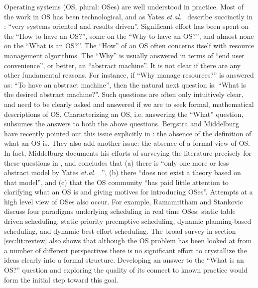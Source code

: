\documentclass[draft]{article}
\def\etal{{\it et.al.}\ }
\begin{document}
Operating systems (OS, plural:  OSes) are well understood in practice.
Most of  the work  in OS  has been technological,  and as  Yates \etal
describe  succinctly  in  \cite{Yates99i/oautomaton}:  ``very  systems
oriented and  results driven''.  Significant effort has  been spent on
the ``How to  have an OS?'', some  on the ``Why to have  an OS?'', and
almost none  on the ``What  is an OS?''.   The ``How'' of an  OS often
concerns itself  with resource management algorithms.   The ``Why'' is
usually answered in  terms of ``end user convenience'',  or better, an
``abstract  machine''.   It  is  not  clear if  there  are  any  other
fundamental reasons.   For instance, if ``Why  manage resources?''  is
answered as:  ``To have an  abstract machine'', then the  natural next
question  is:  ``What  is   the  desired  abstract  machine?''.   Such
questions are  often only  intuitively clear, and  need to  be clearly
asked and answered if we are to seek formal, mathematical descriptions
of OS.   Characterizing an OS, i.e.  answering  the ``What'' question,
subsumes  the  answers to  both  the  above  questions.  Bergstra  and
Middelburg  have  recently  pointed   out  this  issue  explicitly  in
\cite{DBLP:journals/corr/abs-1006-0813}: the absence of the definition
of  what an OS  is.  They  also add  another issue:  the absence  of a
formal  view of  OS.  In  fact,  Middelburg documents  his efforts  of
surveying   the   literature   precisely   for  these   questions   in
\cite{DBLP:journals/corr/abs-1003-5525}, and  concludes that (a) there
is  ``only   one  more   or  less  abstract   model  by   Yates  \etal
\cite{Yates99i/oautomaton}'',  (b)  there ``does  not  exist a  theory
based on that model'', and (c) that the OS community ``has paid little
attention  to  clarifying  what  an  OS  is  and  giving  motives  for
introducing OSes''.  Attempts at a high level view of OSes also occur.
For         example,         Ramamritham         and         Stankovic
\cite{Ramamritham94schedulingalgorithms}    discuss   four   paradigms
underlying  scheduling   in  real  time  OSes:   static  table  driven
scheduling,    static   priority   preemptive    scheduling,   dynamic
planning-based  scheduling, and dynamic  best effort  scheduling.  The
broad survey in section  \ref{sec:lit:review} also shows that although
the  OS  problem  has  been  looked  at from  a  number  of  different
perspectives there  is no significant effort to  crystallize the ideas
clearly into a  formal structure.  Developing an answer  to the ``What
is  an OS?''  question  and exploring  the quality  of its  connect to
known practice would form the initial step toward this goal.
\end{document}

